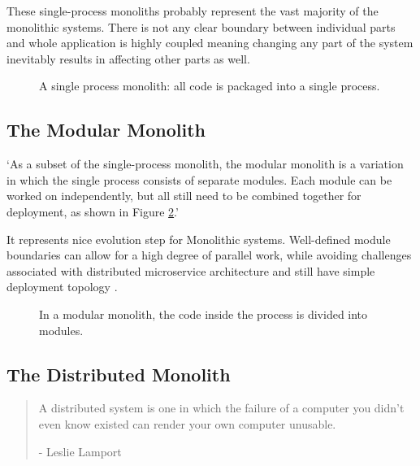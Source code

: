 These single-process monoliths probably represent the vast majority of the monolithic systems. There is not any clear boundary between individual parts and whole application is highly coupled \cite{EVOLUTIONARY_ARCHITERUES_COUPLING} meaning changing any part of the system inevitably results in affecting other parts as well.

\begin{figure}
    \centering
    
    \caption{A single process monolith: all code is packaged into a single process. \cite{MON_TO_MS_MONOLITH}\label{img:monolith_single_process}}
\end{figure}


\subsection{The Modular Monolith}
\label{section:modular_monolith}
`As a subset of the single-process monolith, the modular monolith is a variation in which the single process consists of separate modules. Each module can be worked on independently, but all still need to be combined together for deployment, as shown in Figure \ref{img:monolith_single_process_modular}.' \cite{BUILDING_MS_MONOLITH}

It represents nice evolution step for Monolithic systems. Well-defined module boundaries can allow for a high degree of parallel work, while avoiding challenges associated with distributed microservice architecture and still have simple deployment topology \cite{BUILDING_MS_MONOLITH}.


\begin{figure}
    \centering
    
    \caption{In a modular monolith, the code inside the process is divided into modules. \cite{BUILDING_MS_MONOLITH}\label{img:monolith_single_process_modular}}
\end{figure}


\subsection{The Distributed Monolith}
\begin{quote}
    A distributed system is one in which the failure of a computer you didn’t even know existed can render your own computer unusable. \cite{lamport1987distribution}
    \begin{flushright}
        - Leslie Lamport
    \end{flushright}
\end{quote}

